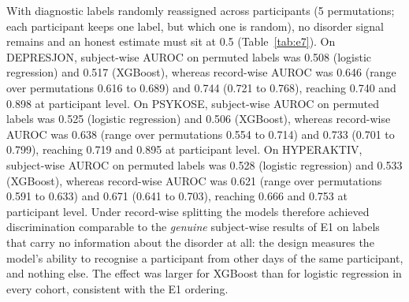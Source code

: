 With diagnostic labels randomly reassigned across participants (5 permutations; each participant keeps one label, but which one is random), no disorder signal remains and an honest estimate must sit at 0.5 (Table~\ref{tab:e7}). On DEPRESJON, subject-wise AUROC on permuted labels was 0.508 (logistic regression) and 0.517 (XGBoost), whereas record-wise AUROC was 0.646 (range over permutations 0.616 to 0.689) and 0.744 (0.721 to 0.768), reaching 0.740 and 0.898 at participant level. On PSYKOSE, subject-wise AUROC on permuted labels was 0.525 (logistic regression) and 0.506 (XGBoost), whereas record-wise AUROC was 0.638 (range over permutations 0.554 to 0.714) and 0.733 (0.701 to 0.799), reaching 0.719 and 0.895 at participant level. On HYPERAKTIV, subject-wise AUROC on permuted labels was 0.528 (logistic regression) and 0.533 (XGBoost), whereas record-wise AUROC was 0.621 (range over permutations 0.591 to 0.633) and 0.671 (0.641 to 0.703), reaching 0.666 and 0.753 at participant level. Under record-wise splitting the models therefore achieved discrimination comparable to the \emph{genuine} subject-wise results of E1 on labels that carry no information about the disorder at all: the design measures the model's ability to recognise a participant from other days of the same participant, and nothing else. The effect was larger for XGBoost than for logistic regression in every cohort, consistent with the E1 ordering.
